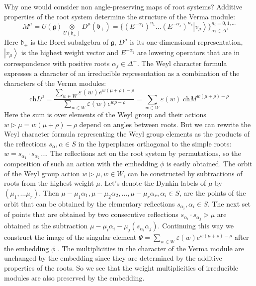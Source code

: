 \documentclass[12pt]{iopart}
\newcommand{\gf}{\mathfrak{g}}
\newcommand{\bff}{\mathfrak{b}}
\begin{document}
Why one would consider non angle-preserving maps of root systems? Additive properties of the root system
determine the structure of the Verma module:
    \begin{equation*}
      M^{\mu}=U(\gf)\underset{U(\bff_{+})}{\otimes} D^{\mu}(\bff_{+})=\{(E^{-\alpha_{1}})^{n_{1}}\dots (E^{-\alpha_{s}})^{n_{s}} \left|v_{\mu}\right>\}_{\alpha_{i}\in\Delta^{+}}^{n_{i}=0,1,\dots}
    \end{equation*}
Here $\bff_{+}$ is the Borel subalgebra of $\gf$, $D^{\mu}$ is its one-dimensional representation,
$\left|v_{\mu}\right>$ is the highest weight vector and $E^{-\alpha_{j}}$ are lowering operators
that are in correspondence with positive roots $\alpha_{j}\in \Delta^{+}$. 
The Weyl character formula expresses a character of an irreducible representation as a combination of
the characters of the Verma modules: 
\begin{equation*}
  \mathrm{ch} L^{\mu}=\frac{\sum_{w\in W} \varepsilon(w) e^{w(\mu+\rho)-\rho}}{\sum_{w\in W}\varepsilon(w) e^{w\rho-\rho}}=\sum_{w\in W} \varepsilon(w)\; \mathrm{ch} M^{w(\mu+\rho)-\rho}
\end{equation*}
Here the sum is over elements of the Weyl group and their actions $w\triangleright \mu
=w(\mu+\rho)-\rho$ depend on angles between roots. But we can rewrite the Weyl character formula
representing the Weyl group elements as the products of the reflections $s_{\alpha}, \alpha \in S$ in
the hyperplanes orthogonal to the simple roots: $w=s_{\alpha_{1}}\cdot s_{\alpha_{2}}\dots$. The reflections act
on the root system by permutations, so the composition of such an action with the embedding $\phi$ is easily
obtained. The orbit of the Weyl group action $w\triangleright \mu, w\in W$, can be constructed by
subtractions of roots from the highest weight $\mu$. Let's denote the Dynkin labels of $\mu$ by
$(\mu_{1},\dots \mu_{r})$. Then $\mu-\mu_{1}\alpha_{1}, \mu-\mu_{2}\alpha_{2},\dots,
\mu-\mu_{r}\alpha_{r}, \alpha_{i}\in S$, are the points of the orbit that can be obtained by
the elementary reflections $s_{\alpha_{i}}, \alpha_{i}\in S$. The next set of points that are obtained by
two consecutive reflections $s_{\alpha_{i}}\cdot s_{\alpha_{j}}\triangleright\mu$ are obtained as
the subtraction $\mu-\mu_{i}\alpha_{i}-\mu_{j} (s_{\alpha_{i}}\alpha_{j})$. Continuing this way we
construct the image of the singular element $\Psi=\sum_{w\in W} \varepsilon(w) e^{w(\mu+\rho)-\rho}$
after the embedding $\phi$ \cite{2011arXiv1111.6787L}. The multiplicities in the character of the Verma
module are unchanged by the embedding since they are determined by the additive properties of the roots.
So we see that the weight multiplicities of irreducible modules are also preserved by the embedding.
\end{document}

